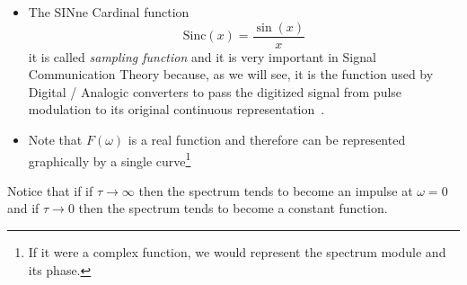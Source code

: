 \begin{itemize}
\item [] The SINne Cardinal function
  \begin{equation*}
    \mathrm{Sinc}(x) = \frac{\sin(x)}{x}
  \end{equation*}
  it is called \emph{sampling function} and it is very important in
  Signal Communication Theory because, as we will see, it is the
  function used by Digital / Analogic converters to pass the digitized
  signal from pulse modulation to its original continuous
  representation~\cite{Lathi}.
  
\item [] Note that $F(\omega)$ is a real function and therefore can be represented graphically by a single curve\footnote{If it were a complex function, we would represent the spectrum module and its phase.}
  
\end{itemize}


\noindent Notice that if if $\tau\rightarrow \infty$ then the spectrum
tends to become an impulse at $\omega=0$ and if $\tau\rightarrow 0$
then the spectrum tends to become a constant function.

